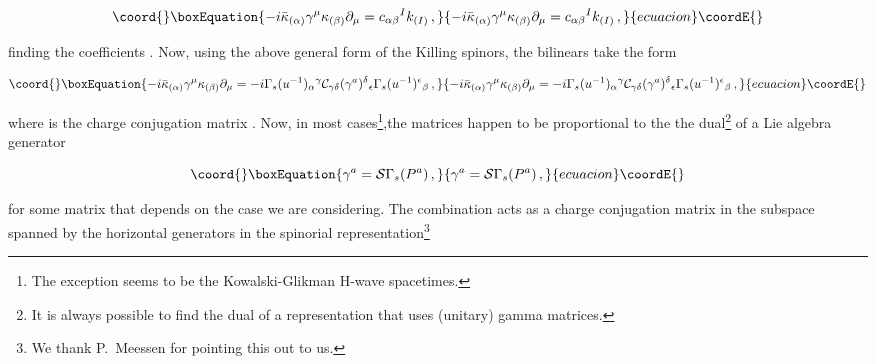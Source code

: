 \documentclass[12pt,a4paper]{article}
\begin{document}
\begin{equation}\coord{}\boxEquation{
-i\bar{\kappa}_{(\alpha)}\gamma^{\mu}\kappa_{(\beta)}\partial_{\mu}
= c_{\alpha\beta}{}^{I}k_{(I)}\, ,  
}{
-i\bar{\kappa}_{(\alpha)}\gamma^{\mu}\kappa_{(\beta)}\partial_{\mu}
= c_{\alpha\beta}{}^{I}k_{(I)}\, ,  
}{ecuacion}\coordE{}\end{equation}

\noindent
finding the coefficients \coordHE{}. Now, using the above
general form of the Killing spinors, the bilinears take the form

\begin{equation}\coord{}\boxEquation{
-i\bar{\kappa}_{(\alpha)}\gamma^{\mu}\kappa_{(\beta)}\partial_{\mu} = 
-i\Gamma_{s}(u^{-1})_{\alpha}{}^{\gamma}\mathcal{C}_{\gamma\delta}
(\gamma^{a})^{\delta}{}_{\epsilon} \Gamma_{s}(u^{-1})^{\epsilon}{}_{\beta}\, ,
}{
-i\bar{\kappa}_{(\alpha)}\gamma^{\mu}\kappa_{(\beta)}\partial_{\mu} = 
-i\Gamma_{s}(u^{-1})_{\alpha}{}^{\gamma}\mathcal{C}_{\gamma\delta}
(\gamma^{a})^{\delta}{}_{\epsilon} \Gamma_{s}(u^{-1})^{\epsilon}{}_{\beta}\, ,
}{ecuacion}\coordE{}\end{equation}

\noindent
where \coordHE{} is the charge conjugation matrix
\coordHE{}.  Now, in
most cases\footnote{The exception seems to be the Kowalski-Glikman
  H\coordHE{}-wave spacetimes.},the matrices \coordHE{} happen to be
proportional to the the dual\footnote{It is always possible to find
  the dual of a representation that uses (unitary) gamma matrices.}
\coordHE{} of a Lie algebra generator \coordHE{}  \coordHE{}

\begin{equation}\coord{}\boxEquation{
\gamma^{a}=\mathcal{S}\Gamma_{s}(P^{a})\, ,  
}{
\gamma^{a}=\mathcal{S}\Gamma_{s}(P^{a})\, ,  
}{ecuacion}\coordE{}\end{equation}

\noindent 
for some matrix \coordHE{} that depends on the case we are
considering.  The combination
\coordHE{} acts as a charge
conjugation matrix in the subspace spanned by the horizontal
generators in the spinorial representation\footnote{We thank
  P.~Meessen for pointing this out to us.} 
\end{document}
